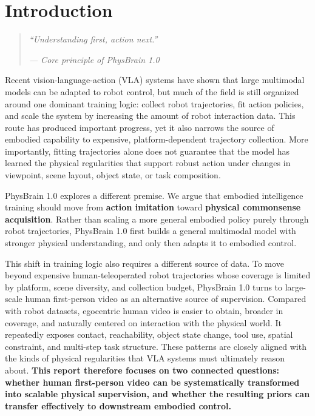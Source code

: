\section{Introduction}
\label{sec:intro}

\vspace{1mm}
\begin{quote}
\raggedright
\textit{``Understanding first, action next.''}\par
\vspace{-0.4em}
\raggedleft
\textit{--- Core principle of PhysBrain 1.0}
\end{quote}

Recent vision-language-action (VLA) systems have shown that large multimodal models can be adapted to robot control, but much of the field is still organized around one dominant training logic: collect robot trajectories, fit action policies, and scale the system by increasing the amount of robot interaction data. This route has produced important progress, yet it also narrows the source of embodied capability to expensive, platform-dependent trajectory collection. More importantly, fitting trajectories alone does not guarantee that the model has learned the physical regularities that support robust action under changes in viewpoint, scene layout, object state, or task composition.

PhysBrain 1.0 explores a different premise. We argue that embodied intelligence training should move from \textbf{action imitation} toward \textbf{physical commonsense acquisition}. Rather than scaling a more general embodied policy purely through robot trajectories, PhysBrain 1.0 first builds a general multimodal model with stronger physical understanding, and only then adapts it to embodied control.

This shift in training logic also requires a different source of data. To move beyond expensive human-teleoperated robot trajectories whose coverage is limited by platform, scene diversity, and collection budget, PhysBrain 1.0 turns to large-scale human first-person video as an alternative source of supervision. Compared with robot datasets, egocentric human video is easier to obtain, broader in coverage, and naturally centered on interaction with the physical world. It repeatedly exposes contact, reachability, object state change, tool use, spatial constraint, and multi-step task structure. These patterns are closely aligned with the kinds of physical regularities that VLA systems must ultimately reason about. \textbf{This report therefore focuses on two connected questions: whether human first-person video can be systematically transformed into scalable physical supervision, and whether the resulting priors can transfer effectively to downstream embodied control.}

